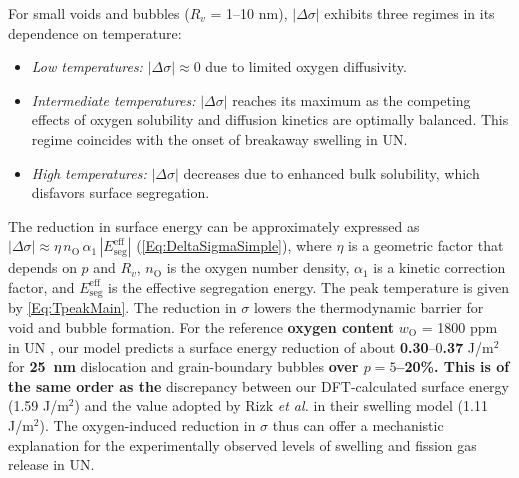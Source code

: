 \documentclass[preprint,12pt,sort&compress]{elsarticle}
\newcommand{\?}{\stackrel{?}{=}}
\providecommand{\DIFaddtex}[1]{{\bf #1}} %
\providecommand{\DIFdeltex}[1]{} %
\providecommand{\DIFaddbegin}{\protect\color{blue}} %
\providecommand{\DIFaddend}{\protect\color{black}} %
\providecommand{\DIFdelbegin}{\protect\color{red}} %
\providecommand{\DIFdelend}{\protect\color{black}} %
\providecommand{\DIFadd}[1]{\texorpdfstring{\DIFaddtex{#1}}{#1}} %
\providecommand{\DIFdel}[1]{\texorpdfstring{\DIFdeltex{#1}}{}} %
\begin{document}
\vspace{0.5cm}

For small voids and bubbles ($R_v$ = 1--10 nm), $|\Delta \sigma|$ exhibits three regimes in its dependence on temperature:
    \begin{itemize}
    \item \textit{Low temperatures:} $|\Delta \sigma| \approx 0$ due to limited oxygen diffusivity.
    \item \textit{Intermediate temperatures:} $|\Delta \sigma|$ reaches its maximum as the competing effects of oxygen solubility and diffusion kinetics are optimally balanced. This regime coincides with the onset of breakaway swelling in UN.
    \item \textit{High temperatures:} $|\Delta \sigma|$ decreases due to enhanced bulk solubility, which disfavors surface segregation.
    \end{itemize}

The reduction in surface energy can be approximately expressed as $|\Delta \sigma| \approx \eta \, n_\text{O} \, \alpha_1 \, |E_\text{seg}^\text{eff}|$ (\cref{Eq:DeltaSigmaSimple}), where $\eta$ is a geometric factor that depends on $p$ and $R_v$, $n_\text{O}$ is the oxygen number density, $\alpha_1$ is a kinetic correction factor, and $E_\text{seg}^\text{eff}$ is the effective segregation energy. The peak temperature is given by \cref{Eq:TpeakMain}. The reduction in $\sigma$ lowers the thermodynamic barrier for void and bubble formation. For the reference \DIFdelbegin \DIFdel{case of }\DIFdelend \DIFaddbegin \DIFadd{oxygen content }\DIFaddend $w_\text{O}$ = 1800 ppm in UN \cite{Ronchi1975}, our model predicts a surface energy reduction of about \DIFdelbegin \DIFdel{0.3}\DIFdelend \DIFaddbegin \DIFadd{0.30}\DIFaddend --0\DIFdelbegin \DIFdel{.4 }\DIFdelend \DIFaddbegin \DIFadd{.37 }\DIFaddend J/m$^2$ for \DIFaddbegin \DIFadd{25~nm }\DIFaddend dislocation and grain-boundary bubbles \DIFdelbegin \DIFdel{. This aligns closely with the }\DIFdelend \DIFaddbegin \DIFadd{over $p=5$--20\%. This is of the same order as the }\DIFaddend discrepancy between our DFT-calculated surface energy (1.59 J/m$^2$) and the value adopted by Rizk \textit{et al.} \cite{Rizk2025} in their swelling model (1.11 J/m$^2$). The oxygen-induced reduction in $\sigma$ thus can offer a mechanistic explanation for the experimentally observed levels of swelling and fission gas release in UN. %
\end{document}
